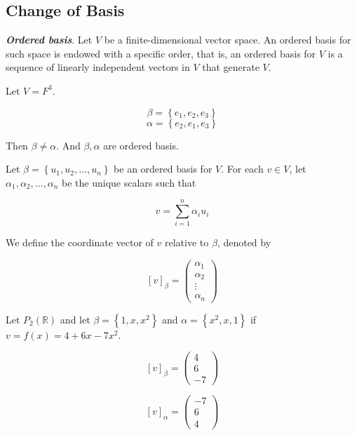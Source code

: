 \documentclass{report}
\begin{document}
    \subsection*{Change of Basis}

    \begin{defBox}
        \textit{\textbf{Ordered basis}}. Let $V$ be a finite-dimensional vector space. An ordered basis for such space is endowed with a specific order, that is, an ordered basis for $V$ is a sequence of linearly independent vectors in $V$ that generate $V$.
    \end{defBox}

    \begin{Example}
        Let $V = F^3$.

        $$\beta = \left\{ e_1, e_2, e_3 \right\}$$
        $$\alpha = \left\{ e_2, e_1, e_3 \right\}$$

        Then $\beta \not = \alpha$. And $\beta, \alpha$ are ordered basis.
    \end{Example}

    \begin{defBox}
        Let $\beta = \left\{ u_1, u_2, \dots , u_n \right\}$ be an ordered basis for $V$. For each $v \in V$, let $\alpha_1, \alpha_2, \dots , \alpha_n$ be the unique scalars such that

        $$v = \sum_{i=1}^{n}\alpha_iu_i$$

        We define the coordinate vector of $v$ relative to $\beta$, denoted by

        $$[v]_\beta = \begin{pmatrix}
            \alpha_1\\ \alpha_2 \\ \vdots \\ \alpha_n
        \end{pmatrix}$$
    \end{defBox}

    \begin{Example}
        Let $P_2(\mathbb{R})$ and let $\beta = \left\{ 1, x, x^2 \right\}$ and $\alpha = \left\{ x^2, x, 1 \right\}$ if $v = f(x) = 4 + 6x -7x^2$.

        $$[v]_\beta = \begin{pmatrix}
            4\\6\\-7
        \end{pmatrix}$$

        $$[v]_\alpha = \begin{pmatrix}
            -7\\6\\4
        \end{pmatrix}$$
    \end{Example}
\end{document}
